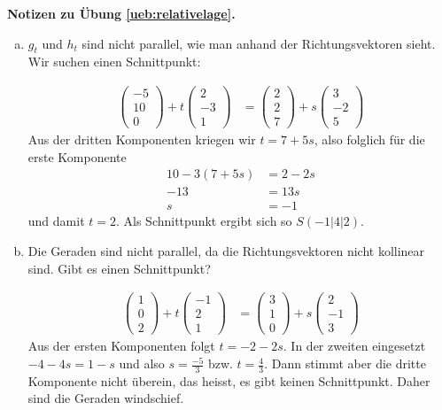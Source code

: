 \documentclass[%
11pt,%
twoside,%
titlepage,%
german,%
headsepline%
]{scrartcl}
\theoremstyle{definition}
\theoremstyle{plain}
\newcommand{\concatueb}[1]{ueb:#1}%
\newcommand{\concatlsg}[1]{lsg:#1}%
\newenvironment{lsg}[1]{%
    \par\noindent\textbf{Notizen zu Übung \ref{\concatueb{#1}}.}%
    \label{\concatlsg{#1}}
}{%
    \par%
}
\begin{document}
\begin{lsg}{relativelage}
\begin{enumerate}[a)]
    \item $g_t$ und $h_t$ sind nicht parallel, wie man anhand der Richtungsvektoren sieht. Wir suchen einen Schnittpunkt:

    \begin{align*}
        \begin{pmatrix}-5\\10\\0\end{pmatrix}+t\begin{pmatrix}2\\-3\\1\end{pmatrix} &= \begin{pmatrix}2\\2\\7\end{pmatrix}+s\begin{pmatrix}3\\-2\\5\end{pmatrix}
    \end{align*}
    Aus der dritten Komponenten kriegen wir $t=7+5s$, also folglich für die erste Komponente
    \begin{align*}
        10-3(7+5s) &= 2-2s\\
        -13 &= 13s\\
        s &= -1
    \end{align*}
    und damit $t=2$. Als Schnittpunkt ergibt sich so $S(-1|4|2)$.

    \item Die Geraden sind nicht parallel, da die Richtungsvektoren nicht kollinear sind. Gibt es einen Schnittpunkt?

    \begin{align*}
    \begin{pmatrix}1\\0\\2\end{pmatrix}+t\begin{pmatrix}-1\\2\\1\end{pmatrix} &= \begin{pmatrix}3\\1\\0\end{pmatrix}+s\begin{pmatrix}2\\-1\\3\end{pmatrix}
    \end{align*}
    Aus der ersten Komponenten folgt $t=-2-2s$. In der zweiten eingesetzt $-4-4s=1-s$ und also $s=\frac{-5}{3}$ bzw. $t=\frac{4}{3}$. Dann stimmt aber die dritte Komponente nicht überein, das heisst, es gibt keinen Schnittpunkt. Daher sind die Geraden windschief.
\end{enumerate}
\end{lsg}
\end{document}
